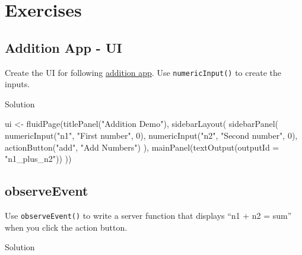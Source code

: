\documentclass[
  oneside]{book}
\newenvironment{Shaded}{\begin{snugshade}}{\end{snugshade}}
\newcommand{\AttributeTok}[1]{\textcolor[rgb]{0.77,0.63,0.00}{#1}}
\newcommand{\DecValTok}[1]{\textcolor[rgb]{0.00,0.00,0.81}{#1}}
\newcommand{\FunctionTok}[1]{\textcolor[rgb]{0.00,0.00,0.00}{#1}}
\newcommand{\NormalTok}[1]{#1}
\newcommand{\OtherTok}[1]{\textcolor[rgb]{0.56,0.35,0.01}{#1}}
\newcommand{\StringTok}[1]{\textcolor[rgb]{0.31,0.60,0.02}{#1}}
\begin{document}
\hypertarget{exercises-first-app}{%
\section{Exercises}\label{exercises-first-app}}

\hypertarget{addition-app---ui}{%
\subsection{Addition App - UI}\label{addition-app---ui}}

Create the UI for following \href{https://shiny.psy.gla.ac.uk/debruine/add_demo/}{addition app}. Use \texttt{numericInput}\texttt{()} to create the inputs.

Solution

\begin{Shaded}
\begin{Highlighting}[]
\NormalTok{ui }\OtherTok{\textless{}{-}} \FunctionTok{fluidPage}\NormalTok{(}\FunctionTok{titlePanel}\NormalTok{(}\StringTok{"Addition Demo"}\NormalTok{),}
                \FunctionTok{sidebarLayout}\NormalTok{(}
                  \FunctionTok{sidebarPanel}\NormalTok{(}
                    \FunctionTok{numericInput}\NormalTok{(}\StringTok{"n1"}\NormalTok{, }\StringTok{"First number"}\NormalTok{, }\DecValTok{0}\NormalTok{),}
                    \FunctionTok{numericInput}\NormalTok{(}\StringTok{"n2"}\NormalTok{, }\StringTok{"Second number"}\NormalTok{, }\DecValTok{0}\NormalTok{),}
                    \FunctionTok{actionButton}\NormalTok{(}\StringTok{"add"}\NormalTok{, }\StringTok{"Add Numbers"}\NormalTok{)}
\NormalTok{                  ),}
                  \FunctionTok{mainPanel}\NormalTok{(}\FunctionTok{textOutput}\NormalTok{(}\AttributeTok{outputId =} \StringTok{"n1\_plus\_n2"}\NormalTok{))}
\NormalTok{                ))}
\end{Highlighting}
\end{Shaded}

\hypertarget{observeevent}{%
\subsection{observeEvent}\label{observeevent}}

Use \texttt{observeEvent}\texttt{()} to write a server function that displays ``n1 + n2 = sum'' when you click the action button.

Solution
\end{document}
